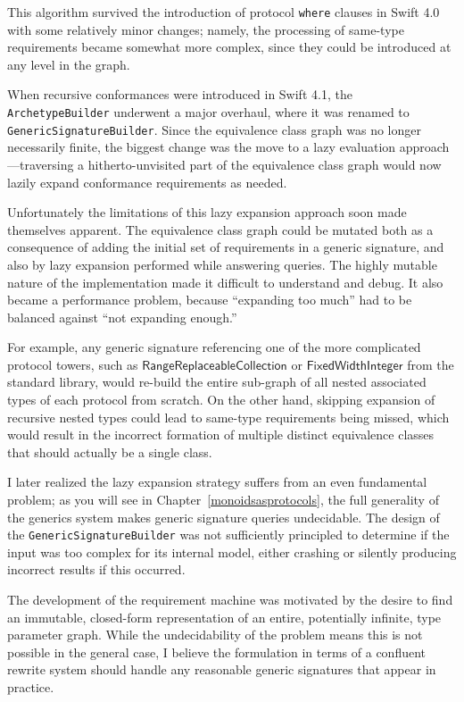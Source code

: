 \documentclass[headsepline,bibliography=totoc]{scrreport}
\newcommand{\proto}[1]{\bm{\mathsf{#1}}}
\theoremstyle{definition}
\theoremstyle{definition}
\theoremstyle{definition}
\begin{document}
This algorithm survived the introduction of protocol \texttt{where} clauses in Swift 4.0 with some relatively minor changes; namely, the processing of same-type requirements became somewhat more complex, since they could be introduced at any level in the graph.

When recursive conformances were introduced in Swift 4.1, the \texttt{ArchetypeBuilder} underwent a major overhaul, where it was renamed to \texttt{GenericSignatureBuilder}. Since the equivalence class graph was no longer necessarily finite, the biggest change was the move to a lazy evaluation approach---traversing a hitherto-unvisited part of the equivalence class graph would now lazily expand conformance requirements as needed.

Unfortunately the limitations of this lazy expansion approach soon made themselves apparent. The equivalence class graph could be mutated both as a consequence of adding the initial set of requirements in a generic signature, and also by lazy expansion performed while answering queries. The highly mutable nature of the implementation made it difficult to understand and debug. It also became a performance problem, because ``expanding too much'' had to be balanced against ``not expanding enough.''

For example, any generic signature referencing one of the more complicated protocol towers, such as $\proto{RangeReplaceableCollection}$ or $\proto{FixedWidthInteger}$ from the standard library, would re-build the entire sub-graph of all nested associated types of each protocol from scratch. On the other hand, skipping expansion of recursive nested types could lead to same-type requirements being missed, which would result in the incorrect formation of multiple distinct equivalence classes that should actually be a single class.

I later realized the lazy expansion strategy suffers from an even fundamental problem; as you will see in Chapter~\ref{monoidsasprotocols}, the full generality of the generics system makes generic signature queries undecidable. The design of the \texttt{GenericSignatureBuilder} was not sufficiently principled to determine if the input was too complex for its internal model, either crashing or silently producing incorrect results if this occurred.

The development of the requirement machine was motivated by the desire to find an immutable, closed-form representation of an entire, potentially infinite, type parameter graph. While the undecidability of the problem means this is not possible in the general case, I believe the formulation in terms of a confluent rewrite system should handle any reasonable generic signatures that appear in practice.
\end{document}
